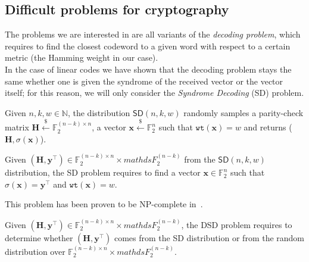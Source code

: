 \subsection{Difficult problems for cryptography}
The problems we are interested in are all variants of the \textit{decoding problem}, which requires to find 
the closest codeword to a given word with respect to a certain metric (the Hamming weight in our case).\\
In the case of linear codes we have shown that the decoding problem stays the same whether one is given 
the syndrome of the received vector or the vector itself; for this reason, we will only consider 
the \textit{Syndrome Decoding} (\textsf{SD}) problem.\\

\begin{definition}
    Given $n,k,w \in \mathds{N}$, the distribution $\textsf{SD}(n, k, w)$ randomly samples a parity-check matrix 
    $\mathbf{H} \xleftarrow{\mathdollar} \mathds{F}_2^{(n-k)\times n}$, a vector 
    $\mathbf{x} \xleftarrow{\mathdollar} \mathds{F}_2^n$ such that $\texttt{wt}(\mathbf{x}) = w$ 
    and returns ($\mathbf{H}, \sigma(\mathbf{x})$).
\end{definition}

\begin{definition}
    Given $(\mathbf{H}, \mathbf{y}^\top) \in \mathds{F}_2^{(n-k)\times n} \times mathds{F}_2^{(n-k)}$ from the $\textsf{SD}(n, k, w)$ 
    distribution, the \textsf{SD} problem requires to find a vector $\mathbf{x} \in \mathds{F}_2^n$ such that 
    $\sigma(\mathbf{x}) = \mathbf{y}^\top$ and $\texttt{wt}(\mathbf{x}) = w$.
\end{definition}
This problem has been proven to be NP-complete in~\cite{berlekamp1978inherent}.

\begin{definition}
    Given $(\mathbf{H}, \mathbf{y}^\top) \in \mathds{F}_2^{(n-k)\times n} \times mathds{F}_2^{(n-k)}$, the \textsf{DSD} problem 
    requires to determine whether $(\mathbf{H}, \mathbf{y}^\top)$ comes from the \textsf{SD} distribution or from the random
    distribution over $\mathds{F}_2^{(n-k)\times n} \times mathds{F}_2^{(n-k)}$.
\end{definition}


 




